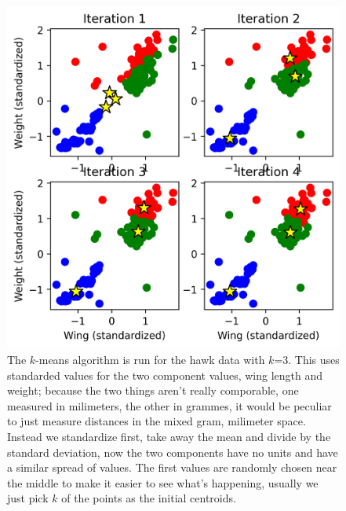 \documentclass[12pt]{article}
\begin{document}
\begin{figure}[htb]
\begin{center}  
  \includegraphics{04.1_khawks.png}
\end{center}
\caption{The $k$-means algorithm is run for the hawk data with
  $k$=3. This uses standarded values for the two component values,
  wing length and weight; because the two things aren't really
  comporable, one measured in milimeters, the other in grammes, it
  would be peculiar to just measure distances in the mixed gram,
  milimeter space. Instead we standardize first, take away the mean
  and divide by the standard deviation, now the two components have no
  units and have a similar spread of values. The first
  values are randomly chosen near the middle to make it easier to see what's happening, usually we just pick $k$ of the points as the
  initial centroids.\label{fig:khawks}}
\end{figure}
\end{document}
